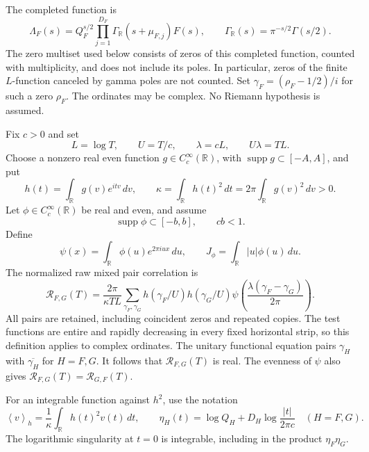 \documentclass[11pt]{article}
\numberwithin{equation}{section}
\theoremstyle{remark}
\newcommand{\R}{\mathbb R}
\newcommand{\supp}{\operatorname{supp}}
\newcommand{\av}[1]{\left\langle #1\right\rangle_h}
\begin{document}
The completed function is
\begin{equation}\label{eq:completion}
 \Lambda_F(s)=Q_F^{s/2}\prod_{j=1}^{D_F}
       \Gamma_\R(s+\mu_{F,j})F(s),\qquad
 \Gamma_\R(s)=\pi^{-s/2}\Gamma(s/2).
\end{equation}
The zero multiset used below consists of zeros of this completed
function, counted with multiplicity, and does not include its poles.
In particular, zeros of the finite $L$-function canceled by gamma poles
are not counted. Set $\gamma_F=(\rho_F-1/2)/i$ for such a zero $\rho_F$.
The ordinates may be complex. No Riemann hypothesis is assumed.

Fix $c>0$ and set
\begin{equation}\label{eq:scales}
 L=\log T,\qquad U=T/c,\qquad \lambda=cL,
 \qquad U\lambda=TL.
\end{equation}
Choose a nonzero real even function $g\in C_c^\infty(\R)$, with
$\supp g\subset[-A,A]$, and put
\begin{equation}\label{eq:h}
 h(t)=\int_\R g(v)e^{itv}\,dv,\qquad
 \kappa=\int_\R h(t)^2\,dt=2\pi\int_\R g(v)^2\,dv>0.
\end{equation}
Let $\phi\in C_c^\infty(\R)$ be real and even, and assume
\begin{equation}\label{eq:support}
 \supp\phi\subset[-b,b],\qquad cb<1.
\end{equation}
Define
\[
 \psi(x)=\int_\R\phi(u)e^{2\pi iux}\,du,\qquad
 J_\phi=\int_\R |u|\phi(u)\,du.
\]
The normalized raw mixed pair correlation is
\begin{equation}\label{eq:correlation}
 \mathcal R_{F,G}(T)=\frac{2\pi}{\kappa TL}
 \sum_{\gamma_F,\gamma_G}
 h(\gamma_F/U)h(\gamma_G/U)
 \psi\!\left(\frac{\lambda(\gamma_F-\gamma_G)}{2\pi}\right).
\end{equation}
All pairs are retained, including coincident zeros and repeated copies.
The test functions are entire and rapidly decreasing in every fixed
horizontal strip, so this definition applies to complex ordinates. The
unitary functional equation pairs $\gamma_H$ with
$\overline{\gamma_H}$ for $H=F,G$. It follows that
$\mathcal R_{F,G}(T)$ is real. The evenness of $\psi$ also gives
$\mathcal R_{F,G}(T)=\mathcal R_{G,F}(T)$.

For an integrable function against $h^2$, use the notation
\begin{equation}\label{eq:eta}
 \av{v}=\frac1\kappa\int_\R h(t)^2v(t)\,dt,
 \qquad \eta_H(t)=\log Q_H+D_H\log\frac{|t|}{2\pi c}
 \quad(H=F,G).
\end{equation}
The logarithmic singularity at $t=0$ is integrable, including in the
product $\eta_F\eta_G$.
\end{document}
